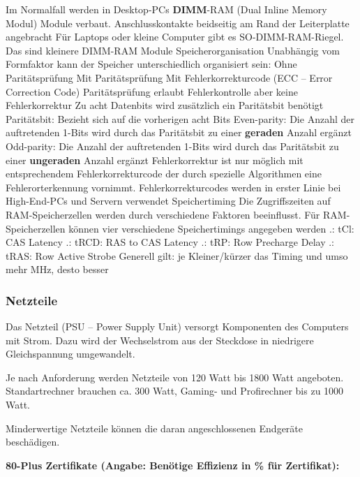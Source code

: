 \documentclass[asp1.tex]{subfiles}
\begin{document}
\begin{outline}
    \2 Im Normalfall werden in Desktop-PCs \textbf{DIMM}-RAM (Dual Inline Memory Modul) Module verbaut. Anschlusskontakte beidseitig am Rand der Leiterplatte angebracht
    \2 Für Laptops oder kleine Computer gibt es SO-DIMM-RAM-Riegel. Das sind kleinere DIMM-RAM Module
    \1 Speicherorganisation
    \2 Unabhängig vom Formfaktor kann der Speicher unterschiedlich organisiert sein:
    \3 Ohne Paritätsprüfung
    \3 Mit Paritätsprüfung
    \3 Mit Fehlerkorrekturcode (ECC – Error Correction Code)
    \2 Paritätsprüfung erlaubt Fehlerkontrolle aber keine Fehlerkorrektur
    \2 Zu acht Datenbits wird zusätzlich ein Paritätsbit benötigt
    \2 Paritätsbit:
    \3 Bezieht sich auf die vorherigen acht Bits
    \3 Even-parity: Die Anzahl der auftretenden 1-Bits wird durch das Paritätsbit zu einer \textbf{geraden} Anzahl ergänzt
    \3 Odd-parity: Die Anzahl der auftretenden 1-Bits wird durch das Paritätsbit zu einer \textbf{ungeraden} Anzahl ergänzt
    \2 Fehlerkorrektur ist nur möglich mit entsprechendem Fehlerkorrekturcode der durch spezielle Algorithmen eine Fehlerorterkennung vornimmt.
    \2 Fehlerkorrekturcodes werden in erster Linie bei High-End-PCs und Servern verwendet
    \1 Speichertiming
    \2 Die Zugriffszeiten auf RAM-Speicherzellen werden durch verschiedene Faktoren beeinflusst. Für RAM-Speicherzellen können vier verschiedene Speichertimings angegeben werden
    .: tCl: CAS Latency
    .: tRCD: RAS to CAS Latency
    .: tRP: Row Precharge Delay
    .: tRAS: Row Active Strobe
    \2 Generell gilt: je Kleiner/kürzer das Timing und umso mehr MHz, desto besser
\end{outline}

\break

\subsubsection{Netzteile}

Das Netzteil (PSU – Power Supply Unit) versorgt Komponenten des Computers mit Strom. Dazu wird der Wechselstrom aus der Steckdose in niedrigere Gleichspannung umgewandelt.

Je nach Anforderung werden Netzteile von 120 Watt bis 1800 Watt angeboten. Standartrechner brauchen ca. 300 Watt, Gaming- und Profirechner bis zu 1000 Watt.

Minderwertige Netzteile können die daran angeschlossenen Endgeräte beschädigen.

\textbf{80-Plus Zertifikate (Angabe: Benötige Effizienz in \% für Zertifikat):}
\end{document}
